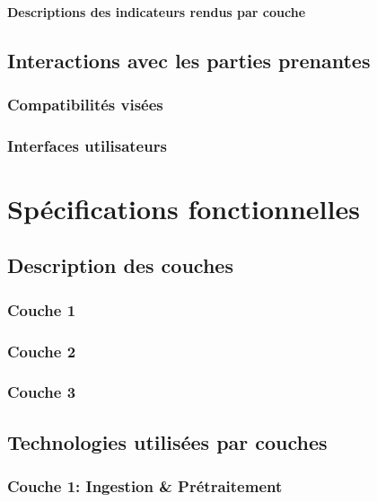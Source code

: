 \documentclass[a4paper,12pt]{report}
\begin{document}
\subsubsection{Descriptions des indicateurs rendus par couche}

\section{Interactions avec les parties prenantes}

\subsection{Compatibilités visées}

\subsection{Interfaces utilisateurs}

\chapter{Spécifications fonctionnelles}

\section{Description des couches}

\subsection{Couche 1}

\subsection{Couche 2}

\subsection{Couche 3}

\section{Technologies utilisées par couches}

\subsection{Couche 1: Ingestion \& Prétraitement}
\end{document}
